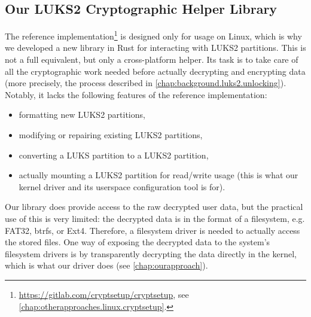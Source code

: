 \subsection{Our LUKS2 Cryptographic Helper Library}
The reference implementation\footnote{\label{fn:background.luks2.referenceimpl} \url{https://gitlab.com/cryptsetup/cryptsetup}, see \autoref{chap:otherapproaches.linux.cryptsetup}.} is designed only for usage on Linux, which is why we developed a new library in Rust for interacting with LUKS2 partitions. This is not a full equivalent, but only a cross-platform helper. Its task is to take care of all the cryptographic work needed before actually decrypting and encrypting data (more precisely, the process described in \autoref{chap:background.luks2.unlocking}). Notably, it lacks the following features of the reference implementation:
\begin{itemize}[label=\textbf{--}]
	\item formatting new LUKS2 partitions,
	\item modifying or repairing existing LUKS2 partitions,
	\item converting a LUKS partition to a LUKS2 partition,
	\item actually mounting a LUKS2 partition for read/write usage (this is what our kernel driver and its userspace configuration tool is for).
\end{itemize}
Our library does provide access to the raw decrypted user data, but the practical use of this is very limited: the decrypted data is in the format of a filesystem, e.g. FAT32, btrfs, or Ext4. Therefore, a filesystem driver is needed to actually access the stored files. One way of exposing the decrypted data to the system's filesystem drivers is by transparently decrypting the data directly in the kernel, which is what our driver does (see \autoref{chap:ourapproach}).

